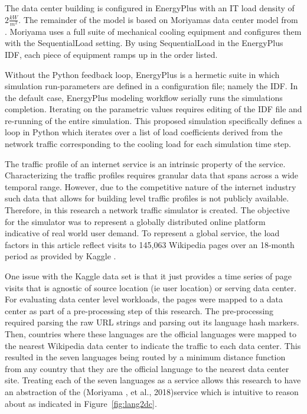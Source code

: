 The data center building is configured in EnergyPlus with an IT load density of $2\frac{kW}{m^2}$. The remainder of the model is based on Moriyama\textsc{}s data center model from \citep{moriyama18}. Moriyama uses a full suite of mechanical cooling equipment and configures them with the SequentialLoad setting. By using SequentialLoad in the EnergyPlus IDF, each piece of equipment ramps up in the order listed. 

Without the Python feedback loop, EnergyPlus is a hermetic suite in which simulation run-parameters are defined in a configuration file; namely the IDF. In the default case, EnergyPlus modeling workflow serially runs the simulations   completion. Iterating on the parametric values requires  editing of the IDF file and re-running of the entire simulation. This proposed simulation specifically defines a loop in Python which iterates over a list of load coefficients derived from the network traffic corresponding to the cooling load for each simulation time step.   

The traffic profile of an internet service is an intrinsic property of the service. Characterizing the traffic profiles requires granular data that spans across a wide temporal range. However, due to the competitive nature of the internet industry such data that allows for building level traffic profiles is not publicly available. Therefore, in this research a network traffic simulator is created. The objective for the simulator was to represent a globally distributed online platform indicative of real world user demand. To represent a global service, the load factors in this article reflect visits to 145,063 Wikipedia pages over an 18-month period as provided by Kaggle \citep{kaggle17}.

One issue with the Kaggle data set is that it just provides a time series of page visits that is agnostic of source location (ie user location) or serving data center. For evaluating data center level workloads, the pages were mapped to a data center as part of a pre-processing step of this research. The pre-processing required parsing the raw URL strings and parsing out it\textsc{}s language hash markers. Then, countries where these languages are the official languages were mapped to the nearest Wikipedia data center to indicate the traffic to each data center.  This resulted in the seven languages being routed by a minimum distance function from any country that they are the official language to the nearest data center site. Treating each of the seven languages as a service allows this research to have an abstraction of the (Moriyama , et al., 2018)service which is intuitive to reason about as indicated in Figure~\ref{fig:lang2dc}. 

